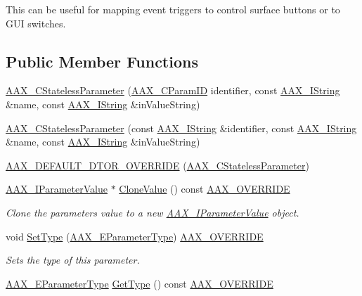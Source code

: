 This can be useful for mapping event triggers to control surface buttons or to G\+UI switches. \subsection*{Public Member Functions}
\begin{DoxyCompactItemize}
\item 
\mbox{\hyperlink{a01541_aa3c39b846a18c151d0f2295b0b93050e}{A\+A\+X\+\_\+\+C\+Stateless\+Parameter}} (\mbox{\hyperlink{a00392_a1440c756fe5cb158b78193b2fc1780d1}{A\+A\+X\+\_\+\+C\+Param\+ID}} identifier, const \mbox{\hyperlink{a01873}{A\+A\+X\+\_\+\+I\+String}} \&name, const \mbox{\hyperlink{a01873}{A\+A\+X\+\_\+\+I\+String}} \&in\+Value\+String)
\item 
\mbox{\hyperlink{a01541_a84bc019e769c5819095c0448c7bcb0c9}{A\+A\+X\+\_\+\+C\+Stateless\+Parameter}} (const \mbox{\hyperlink{a01873}{A\+A\+X\+\_\+\+I\+String}} \&identifier, const \mbox{\hyperlink{a01873}{A\+A\+X\+\_\+\+I\+String}} \&name, const \mbox{\hyperlink{a01873}{A\+A\+X\+\_\+\+I\+String}} \&in\+Value\+String)
\item 
\mbox{\hyperlink{a01541_af16bd3773904749a8db25d11221f2c42}{A\+A\+X\+\_\+\+D\+E\+F\+A\+U\+L\+T\+\_\+\+D\+T\+O\+R\+\_\+\+O\+V\+E\+R\+R\+I\+DE}} (\mbox{\hyperlink{a01541}{A\+A\+X\+\_\+\+C\+Stateless\+Parameter}})
\item 
\mbox{\hyperlink{a01853}{A\+A\+X\+\_\+\+I\+Parameter\+Value}} $\ast$ \mbox{\hyperlink{a01541_a32390258de83c4007fdde4d51a597989}{Clone\+Value}} () const \mbox{\hyperlink{a00392_ac2f24a5172689ae684344abdcce55463}{A\+A\+X\+\_\+\+O\+V\+E\+R\+R\+I\+DE}}
\begin{DoxyCompactList}\small\item\em Clone the parameter\textquotesingle{}s value to a new \mbox{\hyperlink{a01853}{A\+A\+X\+\_\+\+I\+Parameter\+Value}} object. \end{DoxyCompactList}\item 
void \mbox{\hyperlink{a01541_ad8043727979721f1c19f69396b5bce92}{Set\+Type}} (\mbox{\hyperlink{a00491_a4cd0f189daa9a60cf36883c56344bb2e}{A\+A\+X\+\_\+\+E\+Parameter\+Type}}) \mbox{\hyperlink{a00392_ac2f24a5172689ae684344abdcce55463}{A\+A\+X\+\_\+\+O\+V\+E\+R\+R\+I\+DE}}
\begin{DoxyCompactList}\small\item\em Sets the type of this parameter. \end{DoxyCompactList}\item 
\mbox{\hyperlink{a00491_a4cd0f189daa9a60cf36883c56344bb2e}{A\+A\+X\+\_\+\+E\+Parameter\+Type}} \mbox{\hyperlink{a01541_a47efcdd3c7c5672fff2f9fbcc50230df}{Get\+Type}} () const \mbox{\hyperlink{a00392_ac2f24a5172689ae684344abdcce55463}{A\+A\+X\+\_\+\+O\+V\+E\+R\+R\+I\+DE}}

\end{DoxyCompactItemize}
